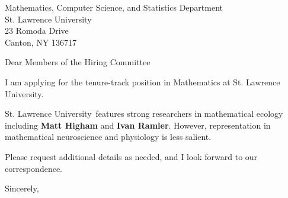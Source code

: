 




	
	
	\def\School{St. Lawrence University}
	
	\begin{letter}
		{Mathematics, Computer Science, and Statistics Department\\
			St. Lawrence University\\
			23 Romoda Drive\\
			Canton, NY 136717
		}
		
		\opening{Dear Members of the Hiring Committee}
		
		
		I am applying for the tenure-track position in Mathematics at \School. 
		
		
		
		\School~features strong researchers in mathematical ecology including \textbf{Matt Higham} and \textbf{Ivan Ramler}. However, representation in mathematical neuroscience and physiology is less salient. 
		
		
		
		
		
		Please request additional details as needed, and I look forward to our correspondence.
		
		\closing{Sincerely,}
	\end{letter}
